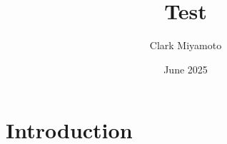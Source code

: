 \documentclass{article}
\title{Test}
\author{Clark Miyamoto}
\date{June 2025}
\begin{document}
\maketitle

\section{Introduction}
\end{document}

